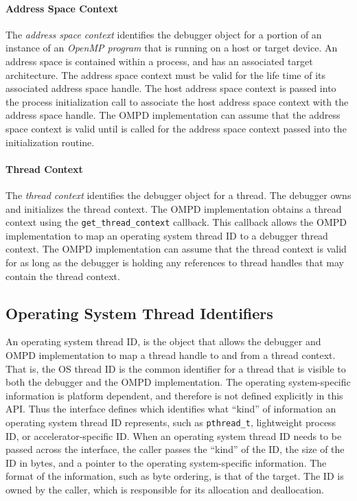 \paragraph{Address Space Context}
The \emph{address space context} identifies the debugger object for a
portion of an instance of an \emph{OpenMP program} that is running on
a host or target device.
An address space is contained within a process, and has an associated
target architecture.
The address space context must be valid for the life time of its
associated address space handle.
The host address space context is passed into the process initialization call
to associate the host address space context with the address space handle.
The OMPD implementation can assume that the address space context is valid
until
is called for the address space context passed into the initialization routine.

\paragraph{Thread Context}
The \emph{thread context} identifies the debugger object for a thread.
The debugger owns and initializes the thread context.
The OMPD implementation obtains a thread context using the
\texttt{get\_thread\_context} callback.
This callback allows the OMPD implementation to map an operating
system thread ID to a debugger thread context.
The OMPD implementation can assume that the thread context is valid
for as long as the debugger is holding any references to thread handles
that may contain the thread context.

\subsection{Operating System Thread Identifiers}

An operating system thread ID,
is the object that allows the debugger and OMPD implementation
to map a thread handle to and from a thread context.
That is, the OS thread ID is the common identifier for a thread
that is visible to both the debugger and the OMPD implementation.
The operating system-specific information is platform dependent,
and therefore is not defined explicitly in this API.
Thus the interface defines
which identifies what ``kind'' of information an operating system
thread ID represents, such as \texttt{pthread\_t},
lightweight process ID, or accelerator-specific ID.
When an operating system thread ID needs to be passed across
the interface, the caller passes the ``kind'' of the ID,
the size of the ID in bytes, and a pointer to the
operating system-specific information.
The format of the information, such as byte ordering, is that
of the target.
The ID is owned by the caller, which is responsible for its
allocation and deallocation.

